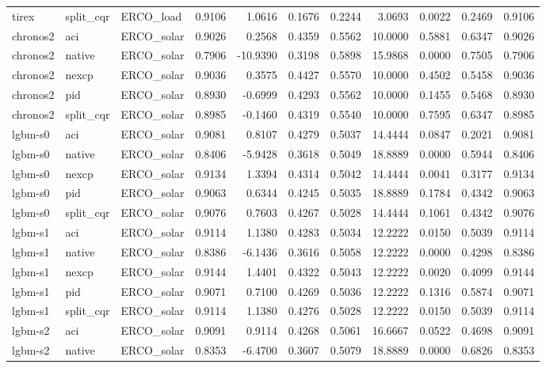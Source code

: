 \begin{tabular}{lllrrrrrrrr}
tirex & split_cqr & ERCO_load & 0.9106 & 1.0616 & 0.1676 & 0.2244 & 3.0693 & 0.0022 & 0.2469 & 0.9106 \\
chronos2 & aci & ERCO_solar & 0.9026 & 0.2568 & 0.4359 & 0.5562 & 10.0000 & 0.5881 & 0.6347 & 0.9026 \\
chronos2 & native & ERCO_solar & 0.7906 & -10.9390 & 0.3198 & 0.5898 & 15.9868 & 0.0000 & 0.7505 & 0.7906 \\
chronos2 & nexcp & ERCO_solar & 0.9036 & 0.3575 & 0.4427 & 0.5570 & 10.0000 & 0.4502 & 0.5458 & 0.9036 \\
chronos2 & pid & ERCO_solar & 0.8930 & -0.6999 & 0.4293 & 0.5562 & 10.0000 & 0.1455 & 0.5468 & 0.8930 \\
chronos2 & split_cqr & ERCO_solar & 0.8985 & -0.1460 & 0.4319 & 0.5540 & 10.0000 & 0.7595 & 0.6347 & 0.8985 \\
lgbm-s0 & aci & ERCO_solar & 0.9081 & 0.8107 & 0.4279 & 0.5037 & 14.4444 & 0.0847 & 0.2021 & 0.9081 \\
lgbm-s0 & native & ERCO_solar & 0.8406 & -5.9428 & 0.3618 & 0.5049 & 18.8889 & 0.0000 & 0.5944 & 0.8406 \\
lgbm-s0 & nexcp & ERCO_solar & 0.9134 & 1.3394 & 0.4314 & 0.5042 & 14.4444 & 0.0041 & 0.3177 & 0.9134 \\
lgbm-s0 & pid & ERCO_solar & 0.9063 & 0.6344 & 0.4245 & 0.5035 & 18.8889 & 0.1784 & 0.4342 & 0.9063 \\
lgbm-s0 & split_cqr & ERCO_solar & 0.9076 & 0.7603 & 0.4267 & 0.5028 & 14.4444 & 0.1061 & 0.4342 & 0.9076 \\
lgbm-s1 & aci & ERCO_solar & 0.9114 & 1.1380 & 0.4283 & 0.5034 & 12.2222 & 0.0150 & 0.5039 & 0.9114 \\
lgbm-s1 & native & ERCO_solar & 0.8386 & -6.1436 & 0.3616 & 0.5058 & 12.2222 & 0.0000 & 0.4298 & 0.8386 \\
lgbm-s1 & nexcp & ERCO_solar & 0.9144 & 1.4401 & 0.4322 & 0.5043 & 12.2222 & 0.0020 & 0.4099 & 0.9144 \\
lgbm-s1 & pid & ERCO_solar & 0.9071 & 0.7100 & 0.4269 & 0.5036 & 12.2222 & 0.1316 & 0.5874 & 0.9071 \\
lgbm-s1 & split_cqr & ERCO_solar & 0.9114 & 1.1380 & 0.4276 & 0.5028 & 12.2222 & 0.0150 & 0.5039 & 0.9114 \\
lgbm-s2 & aci & ERCO_solar & 0.9091 & 0.9114 & 0.4268 & 0.5061 & 16.6667 & 0.0522 & 0.4698 & 0.9091 \\
lgbm-s2 & native & ERCO_solar & 0.8353 & -6.4700 & 0.3607 & 0.5079 & 18.8889 & 0.0000 & 0.6826 & 0.8353 \\

\end{tabular}
